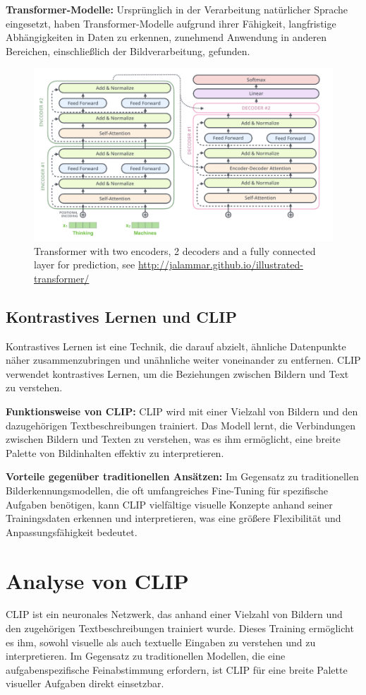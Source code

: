 \documentclass[nolibertine, ngerman, algorithm, nomencl, minted]{ttlab-qualify}
\begin{document}
\textbf{Transformer-Modelle:} Ursprünglich in der Verarbeitung natürlicher Sprache eingesetzt, haben Transformer-Modelle aufgrund ihrer Fähigkeit, langfristige Abhängigkeiten in Daten zu erkennen, zunehmend Anwendung in anderen Bereichen, einschließlich der Bildverarbeitung, gefunden.
\begin{figure}[h]
	\centering
	\includegraphics[scale=0.5]{static/transformer.png}
	\caption{Transformer with two encoders, 2 decoders and a fully connected layer for prediction, see \url{http://jalammar.github.io/illustrated-transformer/}}
	\label{fig:2.3}
\end{figure}

\subsection{Kontrastives Lernen und CLIP}
Kontrastives Lernen ist eine Technik, die darauf abzielt, ähnliche Datenpunkte näher zusammenzubringen und unähnliche weiter voneinander zu entfernen. CLIP verwendet kontrastives Lernen, um die Beziehungen zwischen Bildern und Text zu verstehen.

\textbf{Funktionsweise von CLIP:} CLIP wird mit einer Vielzahl von Bildern und den dazugehörigen Textbeschreibungen trainiert. Das Modell lernt, die Verbindungen zwischen Bildern und Texten zu verstehen, was es ihm ermöglicht, eine breite Palette von Bildinhalten effektiv zu interpretieren.

\textbf{Vorteile gegenüber traditionellen Ansätzen:} Im Gegensatz zu traditionellen Bilderkennungsmodellen, die oft umfangreiches Fine-Tuning für spezifische Aufgaben benötigen, kann CLIP vielfältige visuelle Konzepte anhand seiner Trainingsdaten erkennen und interpretieren, was eine größere Flexibilität und Anpassungsfähigkeit bedeutet.
\section{Analyse von CLIP}
CLIP \parencite{radford2021learning} ist ein neuronales Netzwerk, das anhand einer Vielzahl von Bildern und den zugehörigen Textbeschreibungen trainiert wurde. Dieses Training ermöglicht es ihm, sowohl visuelle als auch textuelle Eingaben zu verstehen und zu interpretieren. Im Gegensatz zu traditionellen Modellen, die eine aufgabenspezifische Feinabstimmung erfordern, ist CLIP für eine breite Palette visueller Aufgaben direkt einsetzbar.
\end{document}
